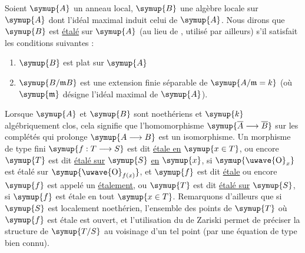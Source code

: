  Soient $\symup{A}$ un anneau local, $\symup{B}$ une algèbre locale sur $\symup{A}$ dont l'idéal maximal
induit celui de $\symup{A}$. Nous dirons que $\symup{B}$ est \uline{étalé} sur $\symup{A}$ (au lieu de
, utilisé par ailleurs) s'il satisfait les conditions suivantes :
\begin{enumerate}
\item[(i)] $\symup{B}$ est plat sur $\symup{A}$
\item[(ii)] $\symup{B/\mathfrak mB}$ est une extension finie séparable de
$\symup{A/\mathfrak m=k}$ (où $\symup{\mathfrak m}$ désigne l'idéal maximal de $\symup{A}$).
\end{enumerate}
Lorsque $\symup{A}$ et $\symup{B}$ sont noethériens et $\symup{k}$ algébriquement clos, cela signifie
que l'homomorphisme $\symup{\overline A\longrightarrow\overline B}$ sur les complétés qui
prolonge $\symup{A\longrightarrow B}$ est un isomorphisme. Un morphisme de type fini
$\symup{f:T\longrightarrow S}$ est dit \uline{étale en} $\symup{x\in T}$, ou encore $\symup{T}$ est dit
\uline{étalé sur} $\symup{S}$ \uline{en} $\symup{x}$, si $\symup{\text{\uwave{O}}_x}$ est étalé sur
$\symup{\text{\uwave{O}}_{f(x)}}$, et $\symup{f}$ est dit \uline{étale} ou encore $\symup{f}$ est appelé un
\uline{étalement}, ou $\symup{T}$ est dit \uline{étalé sur} $\symup{S}$, si $\symup{f}$ est étale en tout
$\symup{x\in T}$. Remarquons d'ailleurs que si $\symup{S}$ est localement noethérien,
l'ensemble des points de $\symup{T}$ où $\symup{f}$ est étale est ouvert, et l'utilisation du
 de Zariski permet de préciser la structure de $\symup{T/S}$ au
voisinage d'un tel point (par une équation de type bien connu).

